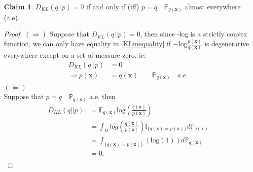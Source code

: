 \documentclass{article}
\theoremstyle{definition}
\newtheorem{claim}{Claim}
\begin{document}
\begin{claim}
 $D_{KL}(q||p) = 0$ if and only if (iff) $p=q \quad \mathbb{P}_{q(\mathbf{x})}$ almost everywhere (a.e).
\end{claim}

\begin{proof}
$(\Rightarrow)$
Suppose that $D_{KL}(q||p) = 0$, then since -log is a strictly convex function, we can only have equality in \ref{KLinequality} if $-\text{log}\frac{p(\mathbf{x})}{q(\mathbf{x})}$ is degenerative everywhere except on a set of measure zero, ie: 
\begin{align*}
D_{KL}(q||p) &= 0\\
\Rightarrow
p(\mathbf{x}) &= q(\mathbf{x}) \qquad \mathbb{P}_{q(\mathbf{x})} \quad a.e.
\end{align*}
$(\Leftarrow)$\\ Suppose that $p=q \quad \mathbb{P}_{q(\mathbf{x})}$ a.e, then 
\begin{align*}
D_{KL}(q||p) &= \mathbb{E}_{q(\mathbf{x})}\text{log}\left(\frac{q(\mathbf{x})}{p(\mathbf{x})}\right)\\
&=\int_{\Omega} {log}\left(\frac{q(\mathbf{x})}{p(\mathbf{x})}\right) \mathbb{I}_{\{q(\mathbf{x})=p(\mathbf{x})\}} d \mathbb{P}_{q(\mathbf{x})}\\
&=\int_{\{q(\mathbf{x})=p(\mathbf{x})\}}(\text{log}(1)) d \mathbb{P}_{q(\mathbf{x})} \\
&= 0.\\
\end{align*}
\end{proof}
\end{document}
